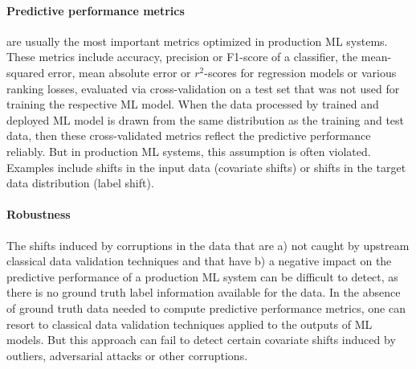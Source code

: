 \paragraph{Predictive performance metrics} are usually the most important metrics optimized in production ML systems. These metrics include accuracy, precision or F1-score of a classifier, the mean-squared error, mean absolute error or $r^2$-scores for regression models or various ranking losses, evaluated via cross-validation on a test set that was not used for training the respective ML model. When the data processed by  trained and deployed ML model is drawn from the same distribution as the training and test data, then these cross-validated metrics reflect the predictive performance reliably. But in production ML systems, this assumption is often violated. Examples include shifts in the input data (covariate shifts) or shifts in the target data distribution (label shift).

\paragraph{Robustness}
The shifts induced by corruptions in the data that are a) not caught by upstream classical data validation techniques and that have b) a negative impact on the predictive performance of a production ML system can be difficult to detect, as there is no ground truth label information available for the data. In the absence of ground truth data needed to compute predictive performance metrics, one can resort to classical data validation techniques applied to the outputs of ML models. But this approach can fail to detect certain covariate shifts induced by outliers, adversarial attacks or other corruptions.

